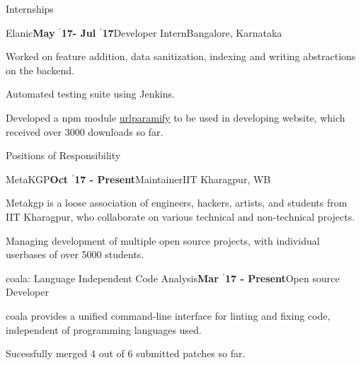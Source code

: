 \documentclass{resume} %
\begin{document}

\begin{rSection}{Internships}

\begin{rSubsection}{\large Elanic}{\textbf{\large May $^{\prime}$17- Jul $^{\prime}$17}}{Developer Intern}{Bangalore, Karnataka}
\item Worked on feature addition, data sanitization, indexing and writing abstractions on the backend.
\item Automated testing suite using Jenkins.
\item Developed a npm module \href{https://www.npmjs.com/package/urlparamify}{urlparamify} to be used in developing website, which received over 3000 downloads so far.
\end{rSubsection}


\end{rSection}


\begin{rSection}{Positions of Responsibility}

\begin{rSubsection}{\large MetaKGP}{\textbf{\large Oct $^{\prime}$17 - Present}}{Maintainer}{IIT Kharagpur, WB}
\item Metakgp is a loose association of engineers, hackers, artists, and students from IIT Kharagpur, who collaborate on various technical and non-technical projects.
\item Managing development of multiple open source projects, with individual userbases of over 5000 students.
\end{rSubsection}

\begin{rSubsection}{\large coala: Language Independent Code Analysis}{\textbf{\large Mar $^{\prime}$17 - Present}}{Open source Developer}{}
\item coala provides a unified command-line interface for linting and fixing code, independent of programming languages used.
\item Sucessfully merged 4 out of 6 submitted patches so far.
\end{rSubsection}

\end{rSection}
\end{document}
